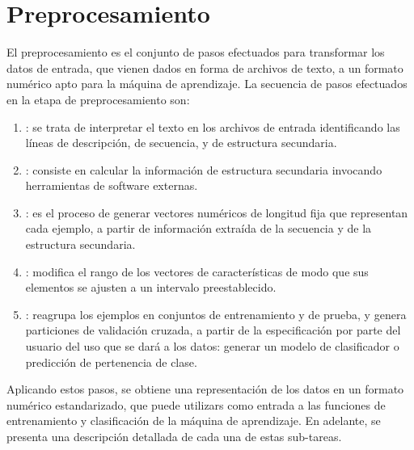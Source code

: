 %
%
%
\section{Preprocesamiento}
%
El preprocesamiento es el conjunto de pasos efectuados para
transformar los datos de entrada, que vienen dados en forma de
archivos de texto, a un formato numérico apto para la máquina de
aprendizaje.
La secuencia de pasos efectuados en la etapa de preprocesamiento son:
%
\begin{enumerate}
\item
  : se trata de interpretar el texto
  en los archivos de entrada identificando las líneas de descripción,
  de secuencia, y de estructura secundaria.
\item
  : consiste en calcular la información de estructura
  secundaria invocando herramientas de software externas.
\item
  : es el proceso de generar vectores
  numéricos de longitud fija que representan cada ejemplo, a partir de
  información extraída de la secuencia y de la estructura secundaria.
\item
  : modifica el rango de los vectores de
  características de modo que sus elementos se ajusten a un intervalo
  preestablecido.
\item
  : reagrupa los ejemplos en
  conjuntos de entrenamiento y de prueba, y genera particiones de
  validación cruzada, a partir de la especificación por parte del
  usuario del uso que se dará a los datos: generar un modelo de
  clasificador o predicción de pertenencia de clase.
\end{enumerate}
%
Aplicando estos pasos, se obtiene una representación de los datos en
un formato numérico estandarizado, que puede utilizars como entrada a
las funciones de entrenamiento y clasificación de la máquina de
aprendizaje.
En adelante, se presenta una descripción detallada de cada una de estas
sub-tareas.
